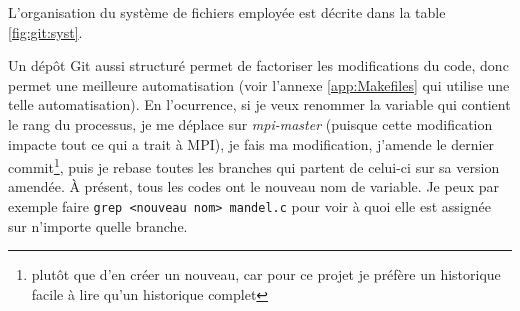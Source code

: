 L'organisation du système de fichiers employée est décrite dans la
table \ref{fig:git:syst}.

Un dépôt Git aussi structuré permet de factoriser les modifications du
code, donc permet une meilleure automatisation (voir l'annexe
\ref{app:Makefiles} qui utilise une telle automatisation). En
l'ocurrence, si je veux renommer la variable qui contient le rang du
processus, je me déplace sur \emph{mpi-master} (puisque cette
modification impacte tout ce qui a trait à MPI), je fais ma
modification, j'amende le dernier commit\footnote{plutôt que d'en
  créer un nouveau, car pour ce projet je préfère un historique facile
  à lire qu'un historique complet}, puis je rebase toutes les branches
qui partent de celui-ci sur sa version amendée. À présent, tous les
codes ont le nouveau nom de variable. Je peux par exemple faire
\texttt{grep <nouveau nom> mandel.c} pour voir à quoi elle est
assignée sur n'importe quelle branche.

\clearpage



